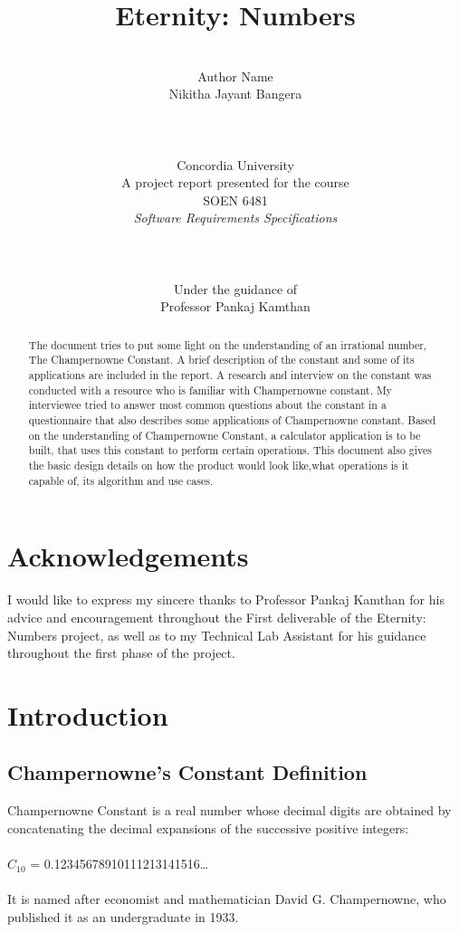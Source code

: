 \documentclass[12pt, a4paper]{report}
\date{}
\title{Eternity: Numbers}
\author{\\ \Large{Author Name}
\\ Nikitha Jayant Bangera
\\
\\
\\
\\ Concordia University
\\
A project report presented for the course\\ 
SOEN 6481 \\\textit{Software Requirements Specifications}
\\ \\ \\ \\
Under the guidance of\\
Professor Pankaj Kamthan
}
\begin{document}
\thispagestyle{headings}
	\maketitle
{}

\thispagestyle{empty}
\chapter*{Acknowledgements}
I would like to express my sincere thanks to Professor Pankaj Kamthan for his advice and encouragement throughout the First deliverable of the Eternity: Numbers project, as well as to my Technical Lab Assistant for his guidance throughout the first phase of the project. 
\thispagestyle{empty}
\begin{abstract}
The document tries to put some light on the understanding of an irrational number, The Champernowne Constant. A brief description of the constant and some of its applications are included in the report. A research and interview on the constant was conducted with a resource who is familiar with Champernowne constant. My interviewee tried to answer most common questions about the constant in a questionnaire that also describes some applications of Champernowne constant. Based on the understanding of Champernowne Constant, a calculator application is to be built, that uses this constant to perform certain operations. This document also gives the basic design details on how the product would look like,what operations is it capable of, its algorithm and use cases.
\end{abstract}

\tableofcontents
\thispagestyle{plain}
\listoffigures

\chapter{Introduction}
\section{Champernowne's Constant Definition}
\quad Champernowne Constant is a real number whose decimal digits are obtained by concatenating the decimal expansions of the successive positive integers:\\\\
\hspace*{30mm} $C_{10}$ = 0.12345678910111213141516…\\\\
It is named after economist and mathematician David G. Champernowne, who published it as an undergraduate in 1933.\\
\end{document}
